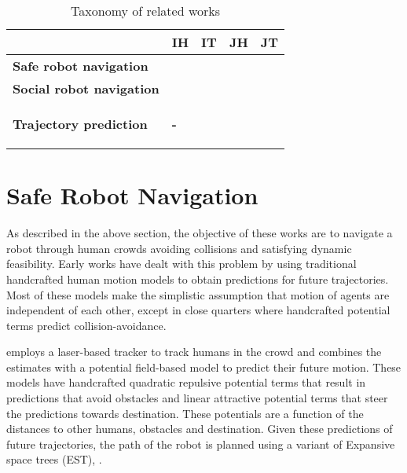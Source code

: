 \begin{table}[H]
  \centering
  \begin{tabular}{|p{5cm}|p{1.5cm}|p{1.5cm}|p{1.5cm}|p{1.5cm}|}
    \hline
     & \textbf{IH} & \textbf{IT} & \textbf{JH} & \textbf{JT}\\
    \hline
    \textbf{Safe robot navigation} & \cite{hoeller2007accompanying} & \cite{aoude2013probabilistically}& \cite{trautman15} & \cite{kim2014brvo} \\
    \hline
    \textbf{Social robot navigation} & \cite{kirby2009companion} & \cite{kim2016socially} & \cite{shiomi2014towards} & \cite{Kretzschmar16} \\
    \hline
    \textbf{Trajectory prediction} & \begin{center}{\textbf{-}}\end{center} & \cite{joseph2011bayesian, kitani2012activity} & \cite{luber2010people} & \cite{pellegrini2010improving, alahi16} \\
    \hline
  \end{tabular}
  \caption{Taxonomy of related works}
  \label{tab:taxonomy}
\end{table}

\section{Safe Robot Navigation}
\label{sec:survey-safe-robot-navig-1}

As described in the above section, the objective of these works are to navigate a robot through human crowds avoiding collisions and satisfying dynamic feasibility. Early works have dealt with this problem by using traditional handcrafted human motion models to obtain predictions for future trajectories. Most of these models make the simplistic assumption that motion of agents are independent of each other, except in close quarters where handcrafted potential terms predict collision-avoidance.

\cite{hoeller2007accompanying} employs a laser-based tracker to track humans in the crowd and combines the estimates with a potential field-based model to predict their future motion. These models have handcrafted quadratic repulsive potential terms that result in predictions that avoid obstacles and linear attractive potential terms that steer the predictions towards destination. These potentials are a function of the distances to other humans, obstacles and destination. Given these predictions of future trajectories, the path of the robot is planned using a variant of Expansive space trees (EST), \cite{hsu02}.

